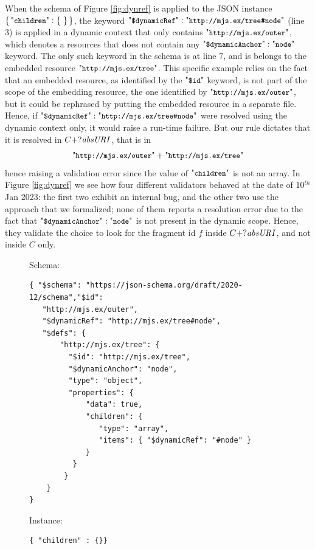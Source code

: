 \begin{toappendix}
When the schema of Figure \ref{fig:dynref} is applied to the JSON instance $\JObj{ \qkw{children}: \JObj{}}$, the keyword 
$\qddref: \qkw{http://mjs.ex/tree\#node}$ (line 3) is applied in a dynamic context that only contains
$\qkw{http://mjs.ex/outer}$, which denotes a resources that does not contain
any $\qdda: \qkw{node}$ keyword. The only such keyword in the schema is at line 7, and is belongs to
the embedded resource $\qkw{http://mjs.ex/tree}$.
This specific example relies on the fact that an embedded resource, as identified by the $\qdid$ keyword, is not
part of the scope of the embedding resource, the one identified by $\qkw{http://mjs.ex/outer}$,
but it could be rephrased by putting the embedded resource in a separate file.
Hence, if $\qddref: \qkw{http://mjs.ex/tree\#node}$ were resolved using the dynamic context only,
it would raise a run-time failure. But our rule dictates that it is resolved in 
$C+?\mathit{absURI}$, that is in $$\qkw{http://mjs.ex/outer}+\qkw{http://mjs.ex/tree}$$
hence raising a validation error since the value of $\qkw{children}$ is not an array.
In Figure \ref{fig:dynref} we see how four different validators behaved at the date of 
10$^{th}$ Jan 2023: the first two exhibit an internal bug, and the other two use the approach that we 
formalized; none of them reports a resolution error due to the fact that 
$\qdda : \qkw{node}$ is not present in the dynamic scope.
Hence, they validate the choice to look for the fragment id $f$ inside $C+?\mathit{absURI}$, and not inside $C$ only.

\begin{figure}[hb]
\small
Schema:
\begin{querybox}{}
\begin{lstlisting}[style=query,escapechar=Z]
{ "$schema": "https://json-schema.org/draft/2020-12/schema","$id":
   "http://mjs.ex/outer",
   "$dynamicRef": "http://mjs.ex/tree#node",
   "$defs": {
       "http://mjs.ex/tree": {
         "$id": "http://mjs.ex/tree",
         "$dynamicAnchor": "node",
         "type": "object",
         "properties": {
             "data": true,
             "children": {
                "type": "array",
                "items": { "$dynamicRef": "#node" }
             }
          }
        }
    }
}
\end{lstlisting}
\end{querybox}

Instance:
\begin{querybox}{}
\begin{lstlisting}[style=querynonumbers]
{ "children" : {}}
\end{lstlisting}
\end{querybox}


\end{figure}
\end{toappendix}
